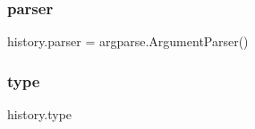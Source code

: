 \subsubsection{\texorpdfstring{parser}{parser}}
{\footnotesize\ttfamily history.\+parser = argparse.\+Argument\+Parser()}

\mbox{\label{namespacehistory_a83a2419001ff099ae979da1aafb842fa}} 
\subsubsection{\texorpdfstring{type}{type}}
{\footnotesize\ttfamily history.\+type}

